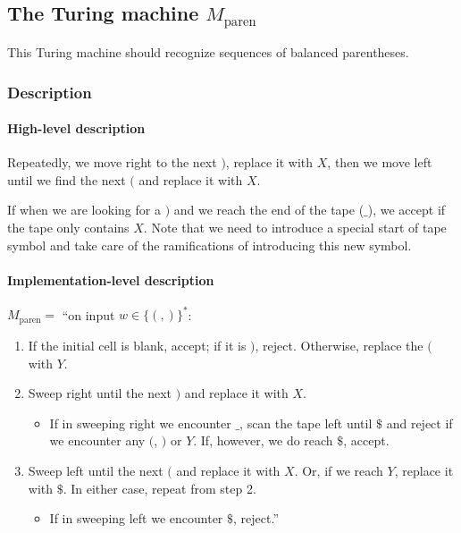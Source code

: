 \subsection{The Turing machine $M_\text{paren}$}

This Turing machine should recognize sequences of balanced parentheses. 

\subsubsection{Description}

\paragraph{High-level description}
Repeatedly, we move right to the next $)$, replace it with $X$, then we move left until we find the next $($ and replace it with $X$. 

If when we are looking for a $)$ and we reach the end of the tape ($\_$), we accept if the tape only contains $X$. Note that we need to introduce a special start of tape symbol and take care of the ramifications of introducing this new symbol.

\paragraph{Implementation-level description}
$M_{\text{paren}}=$
``on input $w \in \{(,)\}^*$:

\begin{enumerate}
    \item If the initial cell is blank, accept; if it is $)$, reject. Otherwise, replace the $($ with $Y$.
    \item Sweep right until the next $)$ and replace it with $X$. 
        \begin{itemize}
            \item If in sweeping right we encounter $\_$, scan the tape left until $\$$ and reject if we encounter any $($, $)$ or $Y$. If, however, we do reach $\$$, accept.
        \end{itemize}
    \item Sweep left until the next $($ and replace it with $X$. Or, if we reach $Y$, replace it with $\$$. In either case, repeat from step 2.
        \begin{itemize}
            \item If in sweeping left we encounter $\$$, reject.''
        \end{itemize}
\end{enumerate}

